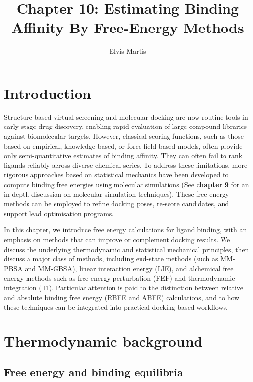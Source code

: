 \documentclass[12pt]{article}
\title{Chapter 10: Estimating Binding Affinity By Free-Energy Methods}
\author{Elvis Martis}
\date{}
\begin{document}
\maketitle

\section{Introduction}

Structure-based virtual screening and molecular docking are now routine tools in early-stage drug discovery, enabling rapid evaluation of large compound libraries against biomolecular targets\cite{CH10_brooijmans2003docking,CH10_jorgensen2004science}. However, classical scoring functions, such as those based on empirical, knowledge-based, or force field-based models, often provide only semi-quantitative estimates of binding affinity. They can often fail to rank ligands reliably across diverse chemical series\cite{CH10_gohlke2000knowledge,CH10_michel2006binding}. To address these limitations, more rigorous approaches based on statistical mechanics have been developed to compute binding free energies using molecular simulations (See \textbf{chapter 9} for an in-depth discussion on molecular simulation techniques). These free energy methods can be employed to refine docking poses, re-score candidates, and support lead optimisation programs.

In this chapter, we introduce free energy calculations for ligand binding, with an emphasis on methods that can improve or complement docking results. We discuss the underlying thermodynamic and statistical mechanical principles, then discuss a major class of methods, including end-state methods (such as MM-PBSA and MM-GBSA), linear interaction energy (LIE), and alchemical free energy methods such as free energy perturbation (FEP) and thermodynamic integration (TI). 
Particular attention is paid to the distinction between relative and absolute binding free energy (RBFE and ABFE) calculations, and to how these techniques can be integrated into practical docking-based workflows. 

\section{Thermodynamic background}

\subsection{Free energy and binding equilibria}
\end{document}

